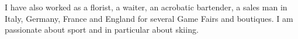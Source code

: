\documentclass[a4paper,10pt]{article}
\begin{document}
I have also worked as a florist, a waiter, an acrobatic bartender, a sales man in Italy, Germany, France and England for several Game Fairs and boutiques. I am passionate about sport and in particular about skiing.




\end{document}

